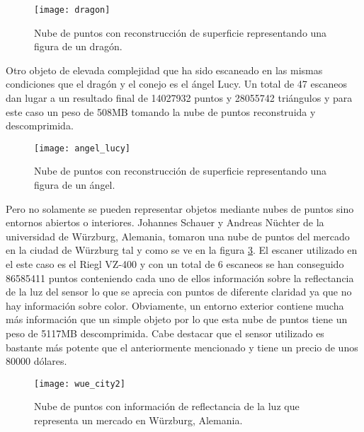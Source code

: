 \begin{figure}
\centering
\texttt{[image: dragon]}
\caption{Nube de puntos con reconstrucción de superficie representando una figura de un dragón.}\label{fig:dragon}
\end{figure}



Otro objeto de elevada complejidad que ha sido escaneado en las mismas condiciones que el dragón y el conejo es el ángel Lucy\cite{pcl_conejo_stanford}. Un total de 47 escaneos dan lugar a un resultado final de 14027932 puntos y 28055742 triángulos y para este caso un peso de 508MB tomando la nube de puntos reconstruida y descomprimida.

\begin{figure}
\centering
\texttt{[image: angel\_lucy]}
\caption{Nube de puntos con reconstrucción de superficie representando una figura de un ángel.}\label{fig:angel_lucy}
\end{figure}

Pero no solamente se pueden representar objetos mediante nubes de puntos sino entornos abiertos o interiores. Johannes Schauer y Andreas Nüchter de la universidad de Würzburg, Alemania, tomaron una nube de puntos\cite{pcd_exteriores} del mercado en la ciudad de Würzburg tal y como se ve en la figura \ref{fig:wue_city}.
El escaner utilizado en el este caso es el Riegl VZ-400\cite{escaner_riegl} y con un total de 6 escaneos se han conseguido 86585411 puntos conteniendo cada uno de ellos información sobre la reflectancia de la luz del sensor lo que se aprecia con puntos de diferente claridad ya que no hay información sobre color. Obviamente, un entorno exterior contiene mucha más información que un simple objeto por lo que esta nube de puntos tiene un peso de 5117MB descomprimida. Cabe destacar que el sensor utilizado es bastante más potente que el anteriormente mencionado y tiene un precio de unos 80000 dólares.



\begin{figure}
\centering
\texttt{[image: wue\_city2]}
\caption{Nube de puntos con información de reflectancia de la luz que representa un mercado en Würzburg, Alemania.}\label{fig:wue_city}
\end{figure}


